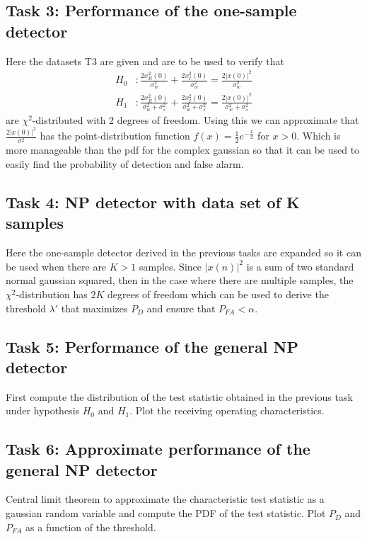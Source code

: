 \subsection{Task 3: Performance of the one-sample detector}
Here the datasets T3 are given and are to be used to verify that
\begin{align}
	H_0 &: \frac{2x_R^2(0)}{\sigma_w^2}+\frac{2x_I^2(0)}{\sigma_w^2}=\frac{2|x(0)|^2}{\sigma_w^2}\label{eq:chi_sq_h0}\\
	H_1 &: \frac{2x_R^2(0)}{\sigma_w^2+\sigma_s^2}+\frac{2x_I^2(0)}{\sigma_w^2+\sigma_s^2}=\frac{2|x(0)|^2}{\sigma_w^2+\sigma_s^2}\label{eq:chi_sq_h1}
\end{align}
are $\chi^2$-distributed with 2 degrees of freedom. Using this we can approximate that $\frac{2|x(0)|^2}{\sigma^2}$ has the point-distribution function $f(x) = \frac{1}{2}e^{-\frac{x}{2}}$ for $x>0$. Which is more manageable than the pdf for the complex gaussian so that it can be used to easily find the probability of detection and false alarm.

\subsection{Task 4: NP detector with data set of K samples}
Here the one-sample detector derived in the previous tasks are expanded so it can be used when there are $K>1$ samples. Since $|x(n)|^2$ is a sum of two standard normal gaussian squared, then in the case where there are multiple samples, the $\chi^2$-distribution has $2K$ degrees of freedom which can be used to derive the threshold $\lambda'$ that maximizes $P_D$ and ensure that $P_{FA}<\alpha$.

\subsection{Task 5: Performance of the general NP detector}
First compute the distribution of the test statistic obtained in the previous task under hypothesis $H_0$ and $H_1$. Plot the receiving operating characteristics.

\subsection{Task 6: Approximate performance of the general NP detector}
Central limit theorem to approximate the characteristic test statistic as a gaussian random variable and compute the PDF of the test statistic. Plot $P_D$ and $P_{FA}$ as a function of the threshold.

